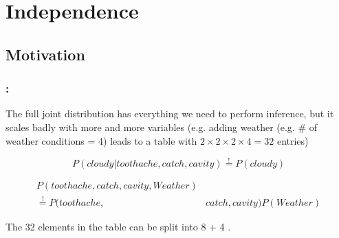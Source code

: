\section{Independence}



\subsection{Motivation}

\begin{frame}\frametitle{\secname:~\subsecname}

The full joint distribution has everything we need to perform inference,
but it scales badly with more and more variables (e.g. adding weather (e.g. \# of weather conditions = 4) leads to a table with $2\times2\times2\times4=32$ entries)

\pause


\pause

\slidesonly{\vspace{-5mm}}

\begin{equation}
P(cloudy | toothache, catch, cavity) \stackrel{!}{=} P(cloudy)
\end{equation}

\pause


\pause


\slidesonly{\vspace{-5mm}}

\begin{align}
P(toothache, catch, cavity, Weather) &\\
\stackrel{!}{=} P(toothache, &catch, cavity)P(Weather)
\end{align}


The 32 elements in the table can be split into  8 + 4 .

\end{frame} 

